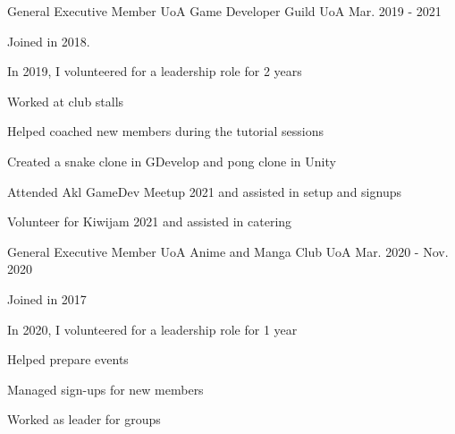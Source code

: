 

\begin{cventries}

  \cventry
    {General Executive Member} %
    {UoA Game Developer Guild} %
    {UoA} %
    {Mar. 2019 - 2021} %
    {
      \begin{cvitems} %
        \item {Joined in 2018.}
        \item {In 2019, I volunteered for a leadership role for 2 years}
        \item {Worked at club stalls}
        \item {Helped coached new members during the tutorial sessions}
        \item {Created a snake clone in GDevelop and pong clone in Unity}
        \item {Attended Akl GameDev Meetup 2021 and assisted in setup and signups}
        \item {Volunteer for Kiwijam 2021 and assisted in catering}
      \end{cvitems}
    }

  \cventry
    {General Executive Member} %
    {UoA Anime and Manga Club} %
    {UoA} %
    {Mar. 2020 - Nov. 2020} %
    {
      \begin{cvitems} %
        \item {Joined in 2017}
        \item {In 2020, I volunteered for a leadership role for 1 year}
        \item {Helped prepare events}
        \item {Managed sign-ups for new members}
        \item {Worked as leader for groups}
      \end{cvitems}
    }


\end{cventries}
